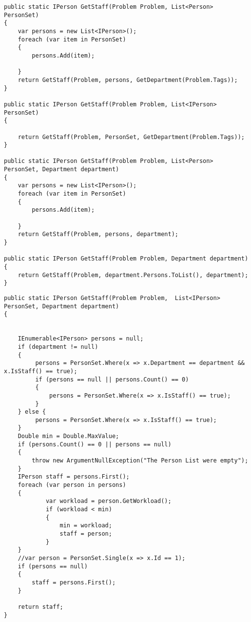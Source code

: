\begin{lstlisting}[style=sourceCode, caption=\myCaption{The overloads for the \me{GetStaff()} method}, label=lst:getstaffoverloads,float=hp]
public static IPerson GetStaff(Problem Problem, List<Person> PersonSet)
{
    var persons = new List<IPerson>();
    foreach (var item in PersonSet)
    {
        persons.Add(item);

    }
    return GetStaff(Problem, persons, GetDepartment(Problem.Tags));
}

public static IPerson GetStaff(Problem Problem, List<IPerson> PersonSet)
{
  
    return GetStaff(Problem, PersonSet, GetDepartment(Problem.Tags));
}

public static IPerson GetStaff(Problem Problem, List<Person> PersonSet, Department department)
{
    var persons = new List<IPerson>();
    foreach (var item in PersonSet)
    {
        persons.Add(item);

    }
    return GetStaff(Problem, persons, department);
}

public static IPerson GetStaff(Problem Problem, Department department)
{
    return GetStaff(Problem, department.Persons.ToList(), department);
}
\end{lstlisting}
\begin{lstlisting}[style=sourceCode, caption=\myCaption{the \me{GetStaff()} method}, label=lst:getstaff,float=hp]
public static IPerson GetStaff(Problem Problem,  List<IPerson> PersonSet, Department department)
{
    
    
    IEnumerable<IPerson> persons = null;
    if (department != null)
    {
         persons = PersonSet.Where(x => x.Department == department && x.IsStaff() == true);
         if (persons == null || persons.Count() == 0)
         {
             persons = PersonSet.Where(x => x.IsStaff() == true);
         }
    } else {
         persons = PersonSet.Where(x => x.IsStaff() == true);
    }
    Double min = Double.MaxValue;
    if (persons.Count() == 0 || persons == null)
    {
        throw new ArgumentNullException("The Person List were empty");
    }
    IPerson staff = persons.First();
    foreach (var person in persons)
    {
            var workload = person.GetWorkload();
            if (workload < min)
            {
                min = workload;
                staff = person;
            }   
    }
    //var person = PersonSet.Single(x => x.Id == 1);
    if (persons == null)
    {
        staff = persons.First();
    }
   
    return staff;
}
\end{lstlisting}